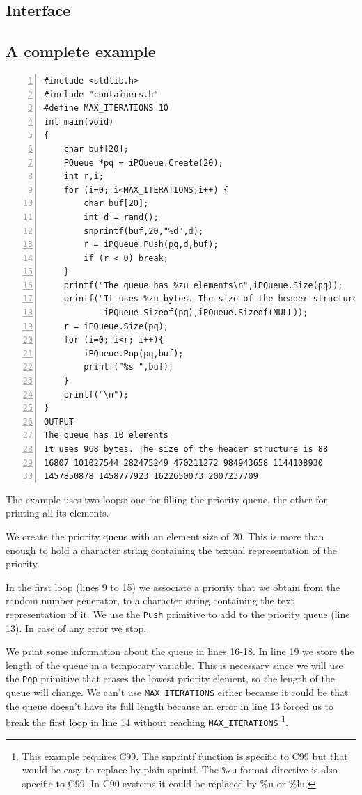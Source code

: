 \documentclass[12pt,a4paper]{memoir} %
\begin{document}
{{\subsection{Interface}

\subsection{A complete example}
\begin{Verbatim}[numbers=left]
#include <stdlib.h>
#include "containers.h"
#define MAX_ITERATIONS 10
int main(void)
{
    char buf[20];
    PQueue *pq = iPQueue.Create(20);
    int r,i;
    for (i=0; i<MAX_ITERATIONS;i++) {
        char buf[20];
        int d = rand();
        snprintf(buf,20,"%d",d);
        r = iPQueue.Push(pq,d,buf);
        if (r < 0) break;
    }
    printf("The queue has %zu elements\n",iPQueue.Size(pq));
    printf("It uses %zu bytes. The size of the header structure is %zu\n",
            iPQueue.Sizeof(pq),iPQueue.Sizeof(NULL));
    r = iPQueue.Size(pq);
    for (i=0; i<r; i++){
        iPQueue.Pop(pq,buf);
        printf("%s ",buf);
    }
    printf("\n");
}
OUTPUT
The queue has 10 elements
It uses 968 bytes. The size of the header structure is 88
16807 101027544 282475249 470211272 984943658 1144108930 
1457850878 1458777923 1622650073 2007237709
\end{Verbatim}
The example uses two loops: one for filling the priority queue, the other for printing all its elements. 

We create the priority queue
with an element size of 20. This is more than enough to hold a character string containing the textual representation of the priority.

In the first loop (lines 9 to 15) we associate a priority that we obtain from the random number generator, to a character string containing
the text representation of it. We use the \verb,Push, primitive to add to the priority queue (line 13). In case of any error we stop. 

We print some information about the queue in lines 16-18. In line 19 we store the length of the queue in a temporary variable.
This is necessary since we will use the \verb,Pop, primitive that erases the lowest priority element, so the length of the queue will
change. We can't use \verb,MAX_ITERATIONS, either because it could be that the queue doesn't have its full length because an error
in line 13 forced us to break the first loop in line 14 without reaching \verb,MAX_ITERATIONS,
\footnote{This example requires C99. The snprintf function is specific to C99 but that would be easy to replace by plain sprintf. The 
\verb,%zu, format directive is also specific to C99. In C90 systems it could be replaced by \%u or \%lu.
}.

}}
\end{document}
